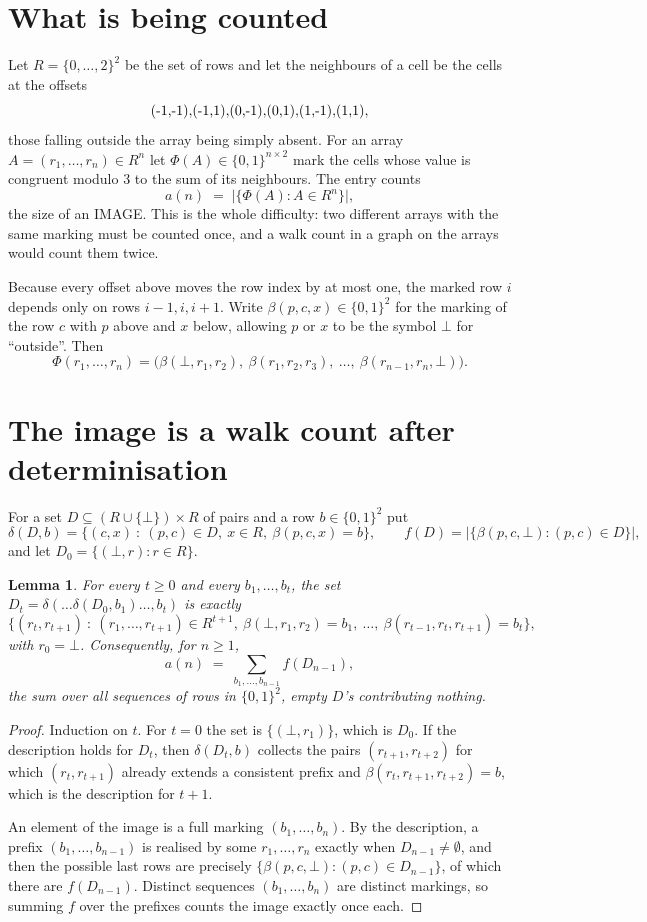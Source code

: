 \documentclass[11pt,a4paper]{article}
\theoremstyle{plain}
\newtheorem{lemma}[theorem]{Lemma}
\theoremstyle{definition}
\begin{document}
\section{What is being counted}

Let $R=\{0,\dots,2\}^{2}$ be the set of rows and let the neighbours of a cell be the
cells at the offsets
\[
$(-1,-1)$, $(-1,1)$, $(0,-1)$, $(0,1)$, $(1,-1)$, $(1,1)$,
\]
those falling outside the array being simply absent. For an array
$A=(r_1,\dots,r_n)\in R^n$ let $\Phi(A)\in\{0,1\}^{n\times2}$ mark the cells whose value
is congruent modulo 3 to the sum of its neighbours. The entry counts
\[
a(n)\;=\;\bigl|\{\Phi(A):A\in R^n\}\bigr| ,
\]
the size of an IMAGE. This is the whole difficulty: two different arrays with the same marking
must be counted once, and a walk count in a graph on the arrays would count them twice.

Because every offset above moves the row index by at most one, the marked row $i$ depends only
on rows $i-1,i,i+1$. Write $\beta(p,c,x)\in\{0,1\}^{2}$ for the marking of the row $c$
with $p$ above and $x$ below, allowing $p$ or $x$ to be the symbol $\bot$ for ``outside''.
Then
\[
\Phi(r_1,\dots,r_n)=\bigl(\beta(\bot,r_1,r_2),\ \beta(r_1,r_2,r_3),\ \dots,\
\beta(r_{n-1},r_n,\bot)\bigr).
\]

\section{The image is a walk count after determinisation}

For a set $D\subseteq(R\cup\{\bot\})\times R$ of pairs and a row $b\in\{0,1\}^{2}$ put
\[
\delta(D,b)=\{(c,x)\ :\ (p,c)\in D,\ x\in R,\ \beta(p,c,x)=b\},\qquad
f(D)=\bigl|\{\beta(p,c,\bot):(p,c)\in D\}\bigr| ,
\]
and let $D_0=\{(\bot,r):r\in R\}$.

\begin{lemma}\label{lem:det}
For every $t\ge0$ and every $b_1,\dots,b_t$, the set
$D_t=\delta(\dots\delta(D_0,b_1)\dots,b_t)$ is exactly
\[
\{(r_t,r_{t+1})\ :\ (r_1,\dots,r_{t+1})\in R^{t+1},\ \beta(\bot,r_1,r_2)=b_1,\ \dots,\
\beta(r_{t-1},r_t,r_{t+1})=b_t\} ,
\]
with $r_0=\bot$. Consequently, for $n\ge1$,
\[
a(n)\;=\;\sum_{b_1,\dots,b_{n-1}}f(D_{n-1}),
\]
the sum over all sequences of rows in $\{0,1\}^{2}$, empty $D$'s contributing nothing.
\end{lemma}

\begin{proof}
Induction on $t$. For $t=0$ the set is $\{(\bot,r_1)\}$, which is $D_0$. If the description
holds for $D_t$, then $\delta(D_t,b)$ collects the pairs $(r_{t+1},r_{t+2})$ for which
$(r_t,r_{t+1})$ already extends a consistent prefix and
$\beta(r_t,r_{t+1},r_{t+2})=b$, which is the description for $t+1$.

An element of the image is a full marking $(b_1,\dots,b_n)$. By the description, a prefix
$(b_1,\dots,b_{n-1})$ is realised by some $r_1,\dots,r_n$ exactly when $D_{n-1}\neq
\emptyset$, and then the possible last rows are precisely
$\{\beta(p,c,\bot):(p,c)\in D_{n-1}\}$, of which there are $f(D_{n-1})$. Distinct
sequences $(b_1,\dots,b_n)$ are distinct markings, so summing $f$ over the prefixes counts the
image exactly once each.
\end{proof}
\end{document}

